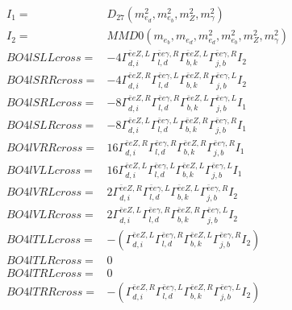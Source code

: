 \documentclass[A4,landscape]{article}
\begin{document}
\begin{align} 
I_1 = & D_{27}(m^2_{e_{{d}}}, m^2_{e_{{b}}}, m^2_{Z}, m^2_{\gamma}) \\ 
I_2 = & MMD0(m_{e_{{b}}}, m_{e_{{d}}}, m^2_{e_{{d}}}, m^2_{e_{{b}}}, m^2_{Z}, m^2_{\gamma}) \\ 
  BO4lSLLcross= & -4  \Gamma^{\bar{e}e Z ,L}_{d, i} \Gamma^{\bar{e}e \gamma ,R}_{l, d} \Gamma^{\bar{e}e Z ,L}_{b, k} \Gamma^{\bar{e}e \gamma ,R}_{j, b} I_2 \\ 
  BO4lSRRcross= & -4  \Gamma^{\bar{e}e Z ,R}_{d, i} \Gamma^{\bar{e}e \gamma ,L}_{l, d} \Gamma^{\bar{e}e Z ,R}_{b, k} \Gamma^{\bar{e}e \gamma ,L}_{j, b} I_2 \\ 
  BO4lSRLcross= & -8  \Gamma^{\bar{e}e Z ,R}_{d, i} \Gamma^{\bar{e}e \gamma ,R}_{l, d} \Gamma^{\bar{e}e Z ,L}_{b, k} \Gamma^{\bar{e}e \gamma ,L}_{j, b} I_1 \\ 
  BO4lSLRcross= & -8  \Gamma^{\bar{e}e Z ,L}_{d, i} \Gamma^{\bar{e}e \gamma ,L}_{l, d} \Gamma^{\bar{e}e Z ,R}_{b, k} \Gamma^{\bar{e}e \gamma ,R}_{j, b} I_1 \\ 
  BO4lVRRcross= & 16  \Gamma^{\bar{e}e Z ,R}_{d, i} \Gamma^{\bar{e}e \gamma ,R}_{l, d} \Gamma^{\bar{e}e Z ,R}_{b, k} \Gamma^{\bar{e}e \gamma ,R}_{j, b} I_1 \\ 
  BO4lVLLcross= & 16  \Gamma^{\bar{e}e Z ,L}_{d, i} \Gamma^{\bar{e}e \gamma ,L}_{l, d} \Gamma^{\bar{e}e Z ,L}_{b, k} \Gamma^{\bar{e}e \gamma ,L}_{j, b} I_1 \\ 
  BO4lVRLcross= & 2  \Gamma^{\bar{e}e Z ,R}_{d, i} \Gamma^{\bar{e}e \gamma ,L}_{l, d} \Gamma^{\bar{e}e Z ,L}_{b, k} \Gamma^{\bar{e}e \gamma ,R}_{j, b} I_2 \\ 
  BO4lVLRcross= & 2  \Gamma^{\bar{e}e Z ,L}_{d, i} \Gamma^{\bar{e}e \gamma ,R}_{l, d} \Gamma^{\bar{e}e Z ,R}_{b, k} \Gamma^{\bar{e}e \gamma ,L}_{j, b} I_2 \\ 
  BO4lTLLcross= & -( \Gamma^{\bar{e}e Z ,L}_{d, i} \Gamma^{\bar{e}e \gamma ,R}_{l, d} \Gamma^{\bar{e}e Z ,L}_{b, k} \Gamma^{\bar{e}e \gamma ,R}_{j, b} I_2) \\ 
  BO4lTLRcross= & 0 \\ 
  BO4lTRLcross= & 0 \\ 
  BO4lTRRcross= & -( \Gamma^{\bar{e}e Z ,R}_{d, i} \Gamma^{\bar{e}e \gamma ,L}_{l, d} \Gamma^{\bar{e}e Z ,R}_{b, k} \Gamma^{\bar{e}e \gamma ,L}_{j, b} I_2) \\ 
\end{align} 
\end{document}
